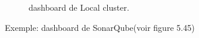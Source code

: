 {\begin{figure}[H]
\begin{center}
    \end{center}
    \caption{dashboard de Local cluster.}
   \end{figure}
    Exemple: dashboard de SonarQube(voir figure 5.45)
\begin{figure}[H]
    \begin{center}

\end{center}
\end{figure}}
